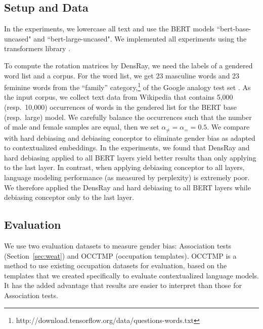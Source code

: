 \subsection{Setup and Data}
In the experiments, we lowercase all text and use the BERT models ``bert-base-uncased" and ``bert-large-uncased". We implemented all experiments using the transformers library \cite{wolf2019huggingfaces}.

To compute the rotation matrices by DensRay, we need the
labels of a gendered word list and a corpus. For the word
list, we get 23 masculine words and 23 feminine words from
the ``family''
category,\footnote{http://download.tensorflow.org/data/questions-words.txt}
of the Google analogy test set \cite{mikolov2013efficient}. As the input corpus, we collect text data from Wikipedia that contains 5,000 (resp.\ 10,000)
occurrences of words in the gendered list for the BERT base
(resp.\ large) model. We carefully balance the occurrences such that the number of male and female samples are equal, then we set  $\alpha_{\neq}=\alpha_{=}=0.5$. We compare with hard debiasing \cite{mu2018all} and debiasing conceptor \cite{karve2019conceptor} to eliminate gender bias as adapted to contextualized embeddings. In the experiments, we found that DensRay and hard debiasing applied to all BERT layers yield better results than only applying to the last layer. In contrast, when applying debiasing conceptor to all layers, language modeling performance (as measured by perplexity) is extremely poor.
We therefore applied the DensRay and hard debiasing to all BERT layers while debiasing conceptor only to the last layer.

\subsection{Evaluation}
We use two evaluation datasets to measure gender bias: Association tests (Section~\ref{sec:weat}) and OCCTMP (occupation templates). OCCTMP is a method to use existing occupation datasets for evaluation, based on the templates that we created specifically to evaluate contextualized language models.  It has the added advantage that results are easier to interpret than those for Association tests.


